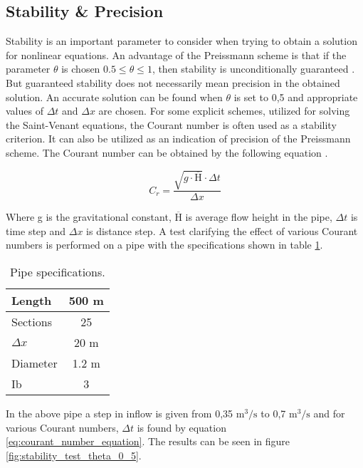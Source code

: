 \subsection{Stability \& Precision} \label{subse:stability_and_precision}

Stability is an important parameter to consider when trying to obtain a solution for nonlinear equations. 
An advantage of the Preissmann scheme is that if the parameter $\theta$ is chosen $0.5 \leq \theta \leq 1$, then stability is unconditionally guaranteed \cite{cunge1980practical}. But guaranteed stability does not necessarily mean precision in the obtained solution. An accurate solution can be found when $\theta$ is set to 0,5 and appropriate values of $\Delta t$ and $\Delta x$ are chosen. For some explicit schemes, utilized for solving the Saint-Venant equations, the Courant number is often used as a stability criterion. It can also be utilized as an indication of precision of the Preissmann scheme. The Courant number can be obtained by the following equation \cite{cunge1980practical,szymkiewicz2010numerical}.

\begin{equation} \label{eq:courant_number_equation}
	C_r =  \frac{\sqrt{g \cdot \overline{\text{H}}} \cdot \Delta t}{\Delta x}
\end{equation}

Where g is the gravitational constant, $\overline{\text{H}}$ is average flow height in the pipe, $\Delta t$ is time step and $\Delta x$ is distance step. A test clarifying the effect of various Courant numbers is performed on a pipe with the specifications shown in table \ref{tab:pipe_stability_test}.

\begin{table}[H]
\centering
\begin{tabular}{|l|c|}  \hline
Length  	& 500 m \\ \hline
Sections 	& 25  	\\ \hline
$\Delta x$	& 20 m  \\ \hline
Diameter	& 1.2 m \\ \hline
Ib			& 3 \textperthousand \\ \hline
\end{tabular}
\caption{Pipe specifications.}
\label{tab:pipe_stability_test}
\end{table}

In the above pipe a step in inflow is given from 0,35 $\text{m}^\text{3}/ \text{s}$ to 0,7 $\text{m}^\text{3}/ \text{s}$ and for various Courant numbers, $\Delta t$ is found by equation \ref{eq:courant_number_equation}. The results can be seen in figure \ref{fig:stability_test_theta_0_5}. 

